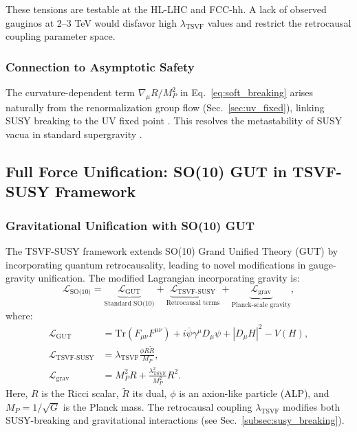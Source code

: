 \documentclass[twocolumn,superscriptaddress,floatfix]{revtex4-2}
\begin{document}
These tensions are testable at the HL-LHC and FCC-hh. A lack of observed gauginos at 2–3 TeV would disfavor high $\lambda_{\text{TSVF}}$ values and restrict the retrocausal coupling parameter space.

\subsubsection{Connection to Asymptotic Safety}  
The curvature-dependent term \(\nabla_\mu R/M_P^2\) in Eq.~\eqref{eq:soft_breaking} arises naturally from the renormalization group flow (Sec.~\ref{sec:uv_fixed}), linking SUSY breaking to the UV fixed point \cite{Reuter2012}. This resolves the metastability of SUSY vacua in standard supergravity \cite{Dine2004}.  

\subsection{Full Force Unification: SO(10) GUT in TSVF-SUSY Framework}
\label{subsec:full_unification}

\subsubsection{Gravitational Unification with SO(10) GUT}
\label{subsec:grav_unification}

The TSVF-SUSY framework extends SO(10) Grand Unified Theory (GUT) by incorporating quantum retrocausality, leading to novel modifications in gauge-gravity unification. The modified Lagrangian incorporating gravity is:
\begin{equation}
\mathcal{L}_{\text{SO(10)}} = \underbrace{\mathcal{L}_{\text{GUT}}}_{\text{Standard SO(10)}} + \underbrace{\mathcal{L}_{\text{TSVF-SUSY}}}_{\text{Retrocausal terms}} + \underbrace{\mathcal{L}_{\text{grav}}}_{\text{Planck-scale gravity}},
\end{equation}
where:
\begin{align}
\mathcal{L}_{\text{GUT}} &= \text{Tr}(F_{\mu\nu}F^{\mu\nu}) + i\overline{\psi}\gamma^\mu D_\mu\psi + |D_\mu H|^2 - V(H), \label{eq:L_GUT} \\
\mathcal{L}_{\text{TSVF-SUSY}} &= \lambda_{\text{TSVF}}\frac{\phi R\tilde{R}}{M_P}, \label{eq:L_TSVF} \\
\mathcal{L}_{\text{grav}} &= M_P^2 R + \frac{\lambda_{\text{TSVF}}^2}{M_P^2}R^2. \label{eq:L_grav}
\end{align}
Here, $R$ is the Ricci scalar, $\tilde{R}$ its dual, $\phi$ is an axion-like particle (ALP), and $M_P = 1/\sqrt{G}$ is the Planck mass. The retrocausal coupling $\lambda_{\text{TSVF}}$ modifies both SUSY-breaking and gravitational interactions (see Sec.~\ref{subsec:susy_breaking}).
\end{document}
